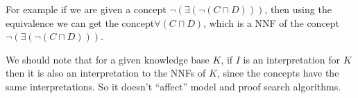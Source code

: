 For example if we are given a concept $\neg (\exists (\neg (C \sqcap
D)))$, then using the equivalence we can get the concept$\forall
(C \sqcap D)$, which is a NNF of the concept $\neg (\exists (\neg
(C \sqcap D)))$.

We should note that for a given knowledge base $K$, if $I$ is an
interpretation for $K$ then it is also an interpretation to the NNFs
of $K$, since the concepts have the same interpretations. So it 
doesn't ``affect'' model and proof search algorithms.

